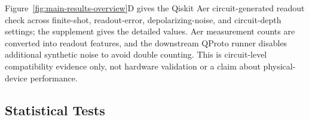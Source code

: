 \documentclass[preprint]{elsarticle}
\renewcommand{\arraystretch}{1.08}
\begin{document}
Figure~\ref{fig:main-results-overview}D gives the Qiskit Aer circuit-generated readout check across finite-shot, readout-error, depolarizing-noise, and circuit-depth settings; the supplement gives the detailed values. Aer measurement counts are converted into readout features, and the downstream QProto runner disables additional synthetic noise to avoid double counting. This is circuit-level compatibility evidence only, not hardware validation or a claim about physical-device performance.

\subsection{Statistical Tests}

\begin{table}[t]
\centering
\caption{Paired significance tests for the main experimental claims. Reported values are mean paired accuracy deltas over matched seeds. One-sided paired \(t\)-tests use Holm correction across all tested comparisons; the supplementary table also reports two-sided Holm values.}
\label{tab:if-significance}
\scriptsize
\setlength{\tabcolsep}{3pt}
\renewcommand{\arraystretch}{0.9}
\end{table}
\end{document}
